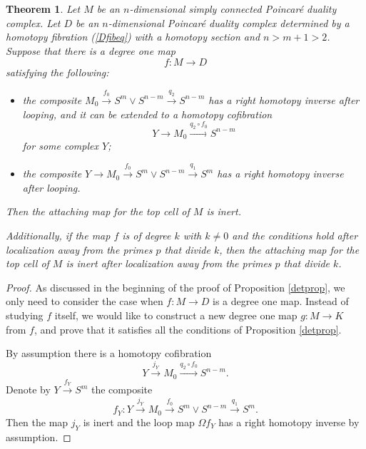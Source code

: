 \documentclass[a4]{amsart}
\newtheorem{theorem}{Theorem}[section]
\theoremstyle{definition}
\begin{document}
\begin{sloppypar}
\begin{theorem}\label{detthm}
Let $M$ be an $n$-dimensional simply connected Poincar\'{e} duality complex. Let $D$ be an $n$-dimensional Poincar\'{e} duality complex determined by a homotopy fibration (\ref{Dfibeq}) with a homotopy section and $n>m+1>2$. Suppose that there is a degree one map 
\[
f: M\stackrel{}{\longrightarrow} D 
\]
satisfying the following:
\begin{itemize}
\item
the composite $M_0\stackrel{f_0}{\longrightarrow} S^{m}\vee S^{n-m}\stackrel{q_2}{\longrightarrow}  S^{n-m}$ has a right homotopy inverse after looping, and it can be extended to a homotopy cofibration 
\[
Y\stackrel{}{\longrightarrow}M_0\stackrel{q_2\circ f_0}{\longrightarrow} S^{n-m}
\]
for some complex $Y$;
\item the composite $Y\stackrel{}{\longrightarrow}M_0\stackrel{f_0}{\longrightarrow} S^{m}\vee S^{n-m}\stackrel{q_1}{\longrightarrow} S^{m}$ has a right homotopy inverse after looping. 
\end{itemize}
Then the attaching map for the top cell of $M$ is inert.

Additionally, if the map $f$ is of degree $k$ with $k\neq 0$ and the conditions hold after localization away from the primes $p$ that divide $k$, then the attaching map for the top cell of $M$ is inert after localization away from the primes $p$ that divide $k$.
\end{theorem}
\begin{proof}
As discussed in the beginning of the proof of Proposition \ref{detprop}, we only need to consider the case when $f: M\stackrel{}{\longrightarrow} D$ is a degree one map. Instead of studying $f$ itself, we would like to construct a new degree one map $g: M\stackrel{}{\longrightarrow} K$ from $f$, and prove that it satisfies all the conditions of Proposition \ref{detprop}.

By assumption there is a homotopy cofibration
\[
Y\stackrel{j_Y}{\longrightarrow} M_0\stackrel{q_2\circ f_0}{\longrightarrow} S^{n-m}. 
\]
Denote by $Y\stackrel{f_Y}{\longrightarrow} S^m$ the composite 
\begin{equation}\label{fYeq}
f_Y: Y\stackrel{j_Y}{\longrightarrow}M_0\stackrel{f_0}{\longrightarrow} S^{m}\vee S^{n-m}\stackrel{q_1}{\longrightarrow} S^{m}.
\end{equation}
Then the map $j_Y$ is inert and the loop map $\Omega f_Y$ has a right homotopy inverse by assumption.


\end{proof}
\end{sloppypar}
\end{document}
